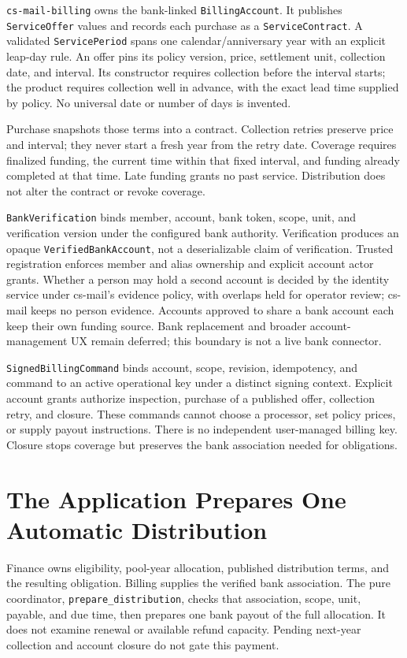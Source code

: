 \documentclass[11pt]{article}
\begin{document}
\texttt{cs-mail-billing} owns the bank-linked \texttt{BillingAccount}.
It publishes \texttt{ServiceOffer} values and records each purchase as a
\texttt{ServiceContract}.
A validated \texttt{ServicePeriod} spans one calendar/anniversary year with an
explicit leap-day rule. An offer pins its policy version, price, settlement unit,
collection date, and interval. Its constructor requires collection before the
interval starts; the product requires collection well in advance, with the exact
lead time supplied by policy. No universal date or number of days is invented.

Purchase snapshots those terms into a contract. Collection retries preserve
price and interval; they never start a fresh year from the retry date. Coverage
requires finalized funding, the current time within that fixed interval, and
funding already completed at that time. Late funding grants no past service.
Distribution does not alter the contract or revoke coverage.

\texttt{BankVerification} binds member, account, bank token, scope, unit, and
verification version under the configured bank authority. Verification produces an
opaque \texttt{VerifiedBankAccount}, not a deserializable claim of verification.
Trusted registration enforces member and alias ownership and explicit account actor
grants. Whether a person may hold a second account is decided by the identity
service under cs-mail's evidence policy, with overlaps held for operator review;
cs-mail keeps no person evidence. Accounts approved to share a bank account each
keep their own funding source. Bank replacement and broader
account-management UX remain deferred; this boundary is not a live bank connector.

\texttt{SignedBillingCommand} binds account, scope, revision, idempotency, and
command to an active operational key under a distinct signing context. Explicit
account grants authorize inspection, purchase of a published offer, collection
retry, and closure. These commands cannot choose a processor, set policy prices,
or supply payout instructions. There is no independent user-managed billing key.
Closure stops coverage but preserves the bank association needed for obligations.

\section{The Application Prepares One Automatic Distribution}

Finance owns eligibility, pool-year allocation, published distribution terms,
and the resulting obligation. Billing supplies the verified bank association.
The pure coordinator, \texttt{prepare\_distribution}, checks that association,
scope, unit, payable, and due time, then prepares one bank payout of
the full allocation. It does not examine renewal or available refund capacity.
Pending next-year collection and account closure do not gate this payment.
\end{document}
